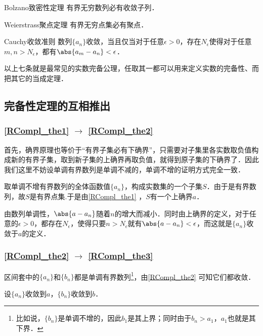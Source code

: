 \begin{theorem}{Bolzano致密性定理}\label{RCompl_the5}
有界无穷数列必有收敛子列．
\end{theorem}

\begin{theorem}{Weierstrass聚点定理}\label{RCompl_the6}
有界无穷点集必有聚点．
\end{theorem}

\begin{theorem}{Cauchy收敛准则}\label{RCompl_the7}
数列$\{a_n\}$收敛，当且仅当对于任意$\epsilon>0$，存在$N_\epsilon$使得对于任意$m, n>N_\epsilon$，都有$\abs{a_m-a_n}<\epsilon$．
\end{theorem}

以上七条就是最常见的实数完备公理，任取其一都可以用来定义实数的完备性、而把其它的当成定理．

\subsection{完备性定理的互相推出}

\subsubsection{\autoref{RCompl_the1} $\to$ \autoref{RCompl_the2} }

首先，确界原理也等价于“有界子集必有下确界”，只需要对子集里各实数取负值构成新的有界子集，取到新子集的上确界再取负值，就得到原子集的下确界了．因此我们这里不妨设单调有界数列是单调不减的，单调不增的证明方式完全一致．

取单调不增有界数列的全体函数值$\{a_n\}$，构成实数集的一个子集$S$．由于是有界数列，故$S$是有界点集.于是由\autoref{RCompl_the1} ，$S$有一个上确界$a$．

由数列单调性，$\abs{a-a_n}$随着$n$的增大而减小．同时由上确界的定义，对于任意的$\epsilon>0$，都存在$N_\epsilon$，使得只要$n>N_\epsilon$就有$\abs{a-a_n}<\epsilon$，而这就是$\{a_n\}$收敛于$a$的定义．

\subsubsection{\autoref{RCompl_the2} $\to$ \autoref{RCompl_the3} }

区间套中的$\{a_n\}$和$\{b_n\}$都是单调有界数列\footnote{比如说，$\{b_n\}$是单调不增的，因此$b_1$是其上界；同时由于$b_n>a_1$，$a_1$也就是其下界．}，由\autoref{RCompl_the2} 可知它们都收敛．

设$\{a_n\}$收敛到$a$，$\{b_n\}$收敛到$b$．

